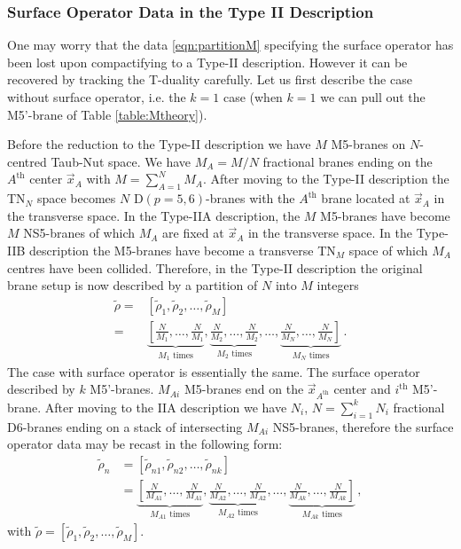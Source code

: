 \documentclass[main.tex]{subfiles}
\begin{document}
\subsubsection{Surface Operator Data in the Type II Description}
One may worry that the data \eqref{eqn:partitionM} specifying the surface operator has been lost upon compactifying to a Type-II description. However it can be recovered by tracking the T-duality carefully. Let us first describe the case without surface operator, i.e. the $k=1$ case (when $k=1$ we can pull out the M5'-brane of Table \ref{table:Mtheory}).

Before the reduction to the Type-II description we have $M$ M5-branes on $N$-centred Taub-Nut space. We have $M_A=M/N$ fractional branes ending on the $A^{\text{th}}$ center $\vec{x}_A$ with $M=\sum_{A=1}^NM_A$. After moving to the Type-II description the TN$_N$ space becomes $N$ D$(p=5,6)$-branes with the $A^{\text{th}}$ brane located at $\vec{x}_A$ in the transverse space. In the Type-IIA description, the $M$ M5-branes have become $M$ NS5-branes of which $M_A$ are fixed at $\vec{x}_A$ in the transverse space. In the Type-IIB description the M5-branes have become a transverse TN$_M$ space of which $M_A$ centres have been collided. Therefore, in the Type-II description the original brane setup is now described by a partition of $N$ into $M$ integers
\begin{align}\label{eqn:partitionN}
\tilde{\rho}=&[\tilde{\rho}_{1},\tilde{\rho}_{2},\dots,\tilde{\rho}_{M}]\\
=&\underbrace{\left[\frac{N}{M_{1}},\dots,\frac{N}{M_{1}}\right.}_{\text{$M_{1}$ times}},\underbrace{\frac{N}{M_{2}},\dots,\frac{N}{M_{2}}}_{\text{$M_{2}$ times}},\dots,\underbrace{\left.\frac{N}{M_{N}},\dots,\frac{N}{M_{N}}\right]}_{\text{$M_{N}$ times}}\,.
\end{align}
The case with surface operator is essentially the same. The surface operator described by $k$ M5'-branes. $M_{Ai}$ M5-branes end on the $\vec{x}_{A^{\text{th}}}$ center and $i^{\text{th}}$ M5'-brane. After moving to the IIA description we have $N_i$, $N=\sum_{i=1}^kN_i$ fractional D6-branes ending on a stack of intersecting $M_{Ai}$ NS5-branes, therefore the surface operator data may be recast in the following form: 
\begin{equation}
\begin{aligned}
\tilde{\rho}_{n}&=[\tilde{\rho}_{n1},\tilde{\rho}_{n2},\dots,\tilde{\rho}_{nk}]\\
&=\underbrace{\left[\frac{N}{M_{A1}},\dots,\frac{N}{M_{A1}}\right.}_{\text{$M_{A1}$ times}},\underbrace{\frac{N}{M_{A2}},\dots,\frac{N}{M_{A2}}}_{\text{$M_{A2}$ times}},\dots,\underbrace{\left.\frac{N}{M_{Ak}},\dots,\frac{N}{M_{Ak}}\right]}_{\text{$M_{Ak}$ times}}\,,\end{aligned}
\end{equation}
with $\tilde{\rho}=[\tilde{\rho}_{1},\tilde{\rho}_2,\dots,\tilde{\rho}_M]$.
\end{document}
